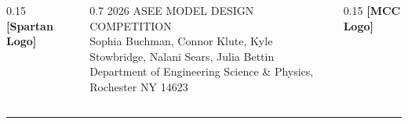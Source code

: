 \documentclass[final]{beamer}
\begin{document}
\begin{frame}[t]

\begin{columns}[T]
    \begin{column}{0.15\paperwidth}
        \centering
        \vspace{1cm}
        \textbf{\color{mccgold}[Spartan Logo]}
    \end{column}

    \begin{column}{0.7\paperwidth}
        \centering
        \vspace{0.5cm}
        {\color{mccgold} 2026 ASEE MODEL DESIGN COMPETITION}\\[0.5em]
        {\color{mccwhite} Sophia Buchman, Connor Klute, Kyle Stowbridge, Nalani Sears, Julia Bettin}\\[0.2em]
        {\color{mccwhite} Department of Engineering Science \& Physics, Rochester NY 14623}
        \vspace{1cm}
    \end{column}

    \begin{column}{0.15\paperwidth}
        \centering
        \vspace{1cm}
        \textbf{\color{mccgold}[MCC Logo]}
    \end{column}
\end{columns}

\vspace{0.5cm}

\textcolor{mccgold}{\rule{\paperwidth}{2pt}}
\vspace{1cm}

\begin{columns}[T]


\end{columns}
\end{frame}
\end{document}

